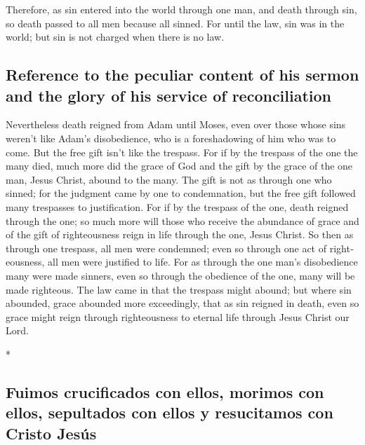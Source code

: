 \begin{paracol}{2}
\begin{otherlanguage}{english}
 Therefore, as sin entered into the world through one
man, and death through sin, so death passed to all men because all
sinned.  For until the law, sin was in the world; but sin
is not charged when there is no law.

\hypertarget{reference-to-the-peculiar-content-of-his-sermon-and-the-glory-of-his-service-of-reconciliation}{%
\subsection{Reference to the peculiar content of his sermon and the
glory of his service of
reconciliation}\label{reference-to-the-peculiar-content-of-his-sermon-and-the-glory-of-his-service-of-reconciliation}}

 Nevertheless death reigned from Adam until Moses, even
over those whose sins weren't like Adam's disobedience, who is a
foreshadowing of him who was to come.  But the free gift
isn't like the trespass. For if by the trespass of the one the many
died, much more did the grace of God and the gift by the grace of the
one man, Jesus Christ, abound to the many.  The gift is
not as through one who sinned; for the judgment came by one to
condemnation, but the free gift followed many trespasses to
justification.  For if by the trespass of the one, death
reigned through the one; so much more will those who receive the
abundance of grace and of the gift of righteousness reign in life
through the one, Jesus Christ.  So then as through one
trespass, all men were condemned; even so through one act of
righteousness, all men were justified to life.  For as
through the one man's disobedience many were made sinners, even so
through the obedience of the one, many will be made righteous.
 The law came in that the trespass might abound; but
where sin abounded, grace abounded more exceedingly, 
that as sin reigned in death, even so grace might reign through
righteousness to eternal life through Jesus Christ our Lord.

\end{otherlanguage}

\switchcolumn[0]*

\hypertarget{fuimos-crucificados-con-ellos-morimos-con-ellos-sepultados-con-ellos-y-resucitamos-con-cristo-jesuxfas}{%
\subsection{Fuimos crucificados con ellos, morimos con ellos, sepultados
con ellos y resucitamos con Cristo
Jesús}\label{fuimos-crucificados-con-ellos-morimos-con-ellos-sepultados-con-ellos-y-resucitamos-con-cristo-jesuxfas}}


\end{paracol}
